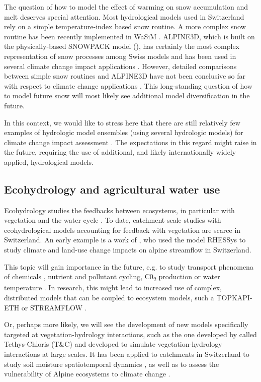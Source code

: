 \documentclass[10pt,a4paper]{article}
\begin{document}
The question of how to model the effect of warming on snow accumulation
and melt deserves special attention. Most hydrological models used in
Switzerland rely on a simple temperature-index based snow routine. A
more complex snow routine has been recently implemented in 
WaSiM \citep{Thornton2019}. ALPINE3D, which is built on the
physically-based SNOWPACK model (\citealt{Lehning2002,Bartelt_2002,Bartelt2002,Lehning_2002}), 
has certainly the most complex representation of snow processes among Swiss 
models and has been used in several climate change impact
applications \citep{Bavay2009,Bavay2013,Marty2017}. However, detailed comparisons between
simple snow routines and ALPINE3D have not been conclusive so far with
respect to climate change applications \citep{Kobierska2011,Shakoor2018}. This
long-standing question of how to model future snow will most likely see
additional model diversification in the future. 

In this context, we would like to stress here that there are still
relatively few examples of hydrologic model ensembles (using several
hydrologic models) for climate change impact
assessment \citep{Kobierska2011,Addor2014}. The expectations in this regard might
raise in the future, requiring the use of additional, and likely
internationally widely applied, hydrological models.

\subsection{Ecohydrology and agricultural water use}
\label{sec:application:echohydrology}

Ecohydrology studies the feedbacks between ecosystems, in particular
with vegetation and the water cycle \citep{tague200}. To date,
catchment-scale studies with ecohydrological models accounting for
feedback with vegetation are scarce in Switzerland. An early example is
a work of \citet{zierl05}, who used the model RHESSys to study
climate and land-use change impacts on alpine streamflow in
Switzerland. 

This topic will gain importance in the future, e.g. to study transport
phenomena of chemicals \citep{queloz2015}, nutrient and pollutant
cycling, C0\textsubscript{2} production or water
temperature \citep{michel2020}. In research, this might lead to
increased use of complex, distributed models that can be coupled to
ecosystem models, such a TOPKAPI-ETH \citep{Pappas_2015} or
STREAMFLOW \citep{Gallice_2016}.

Or, perhaps more likely, we will see the development of new models
specifically targeted at vegetation-hydrology interactions, such as the
one developed by \citet{Fatichi2012,Fatichi2012a} called Tethys-Chloris (T\&C) and
developed to simulate vegetation-hydrology interactions at large scales.
It has been applied to catchments in Switzerland to study soil moisture
spatiotemporal dynamics \citep{Fatichi2015a}, as well as to assess the
vulnerability of Alpine ecosystems to climate change \citep{Mastrotheodoros2019}.
\end{document}
